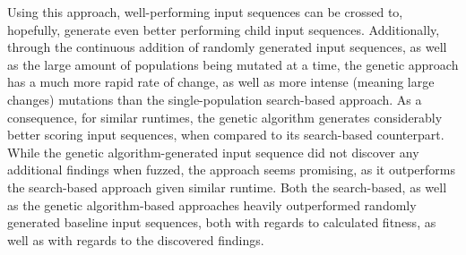 Using this approach, well-performing input sequences can be crossed to, hopefully, generate even better performing child input sequences. Additionally, through the continuous addition of randomly generated input sequences, as well as the large amount of populations being mutated at a time, the genetic approach has a much more rapid rate of change, as well as more intense (meaning large changes) mutations than the single-population search-based approach. As a consequence, for similar runtimes, the genetic algorithm generates considerably better scoring input sequences, when compared to its search-based counterpart. While the genetic algorithm-generated input sequence did not discover any additional findings when fuzzed, the approach seems promising, as it outperforms the search-based approach given similar runtime. Both the search-based, as well as the genetic algorithm-based approaches heavily outperformed randomly generated baseline input sequences, both with regards to calculated fitness, as well as with regards to the discovered findings.